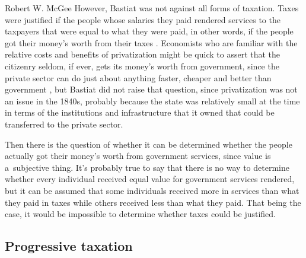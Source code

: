 \begin{artengenv}{Robert W. McGee}
However, Bastiat was not against all forms of taxation. Taxes were justified if the people whose salaries they paid rendered services to the taxpayers that were equal to what they were paid, in other words, if the people got their money's worth from their taxes 
\parencite[][p.182]{bastiat_selected_1964}. %
 Economists who are familiar with the relative costs and benefits of privatization might be quick to assert that the citizenry seldom, if ever, gets its money's worth from government, since the private sector can do just about anything faster, cheaper and better than government 
\parencites[][]{finley_public_1989}[][]{ohashi_privatization_nodate}[][]{pirie_privatization_1988}[][]{savas_privatizing_1991}, %
 but Bastiat did not raise that question, since privatization was not an issue in the 1840s, probably because the state was relatively small at the time in terms of the institutions and infrastructure that it owned that could be transferred to the private sector.



Then there is the question of whether it can be determined whether the people actually got their money's worth from government services, since value is a~subjective thing. It's probably true to say that there is no way to determine whether every individual received equal value for government services rendered, but it can be assumed that some individuals received more in services than what they paid in taxes while others received less than what they paid. That being the case, it would be impossible to determine whether taxes could be justified.



\subsection{Progressive taxation}




\end{artengenv}
